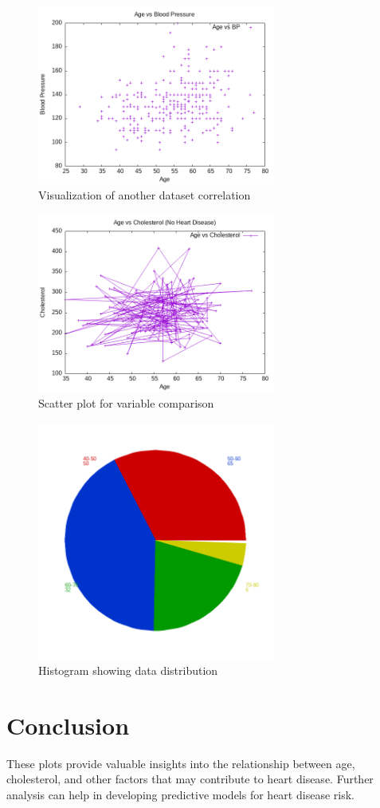 \documentclass{article}
\begin{document}
	\begin{figure}[h!]
		\centering
		\includegraphics[width=0.7\textwidth]{ques4b.png}
		\caption{Visualization of another dataset correlation}
		\label{fig:image2}
	\end{figure}
	
	\begin{figure}[h!]
		\centering
		\includegraphics[width=0.7\textwidth]{ques4c.png}
		\caption{Scatter plot for variable comparison}
		\label{fig:image3}
	\end{figure}
	
	\begin{figure}[h!]
		\centering
		\includegraphics[width=0.7\textwidth]{ques4d.png}
		\caption{Histogram showing data distribution}
		\label{fig:image4}
	\end{figure}
	
	
	
	\section{Conclusion}
	
	These plots provide valuable insights into the relationship between age, cholesterol, and other factors that may contribute to heart disease. Further analysis can help in developing predictive models for heart disease risk.
	
\end{document}

